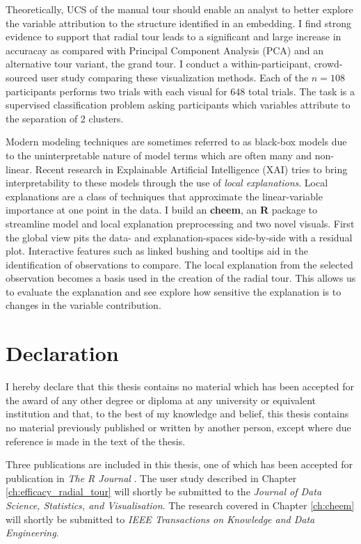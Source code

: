 \documentclass{template/monashthesis}
\begin{document}
Theoretically, UCS of the manual tour should enable an analyst to better explore the variable attribution to the structure identified in an embedding. I find strong evidence to support that radial tour leads to a significant and large increase in accuracay as compared with Principal Component Analysis (PCA) and an alternative tour variant, the grand tour. I conduct a within-participant, crowd-sourced user study comparing these visualization methods. Each of the \(n=108\) participants performs two trials with each visual for 648 total trials. The task is a supervised classification problem asking participants which variables attribute to the separation of 2 clusters.

Modern modeling techniques are sometimes referred to as black-box models due to the uninterpretable nature of model terms which are often many and non-linear. Recent research in Explainable Artificial Intelligence (XAI) tries to bring interpretability to these models through the use of \emph{local explanations}. Local explanations are a class of techniques that approximate the linear-variable importance at one point in the data. I build an \textbf{cheem}, an \textbf{R} package to streamline model and local explanation preprocessing and two novel visuals. First the global view pits the data- and explanation-spaces side-by-side with a residual plot. Interactive features such as linked bushing and tooltips aid in the identification of observations to compare. The local explanation from the selected observation becomes a basis used in the creation of the radial tour. This allows us to evaluate the explanation and see explore how sensitive the explanation is to changes in the variable contribution.

\clearpage{}\setcounter{page}{0}

\hypertarget{declaration}{%
\chapter*{Declaration}\label{declaration}}

I hereby declare that this thesis contains no material which has been accepted for the award of any other degree or diploma at any university or equivalent institution and that, to the best of my knowledge and belief, this thesis contains no material previously published or written by another person, except where due reference is made in the text of the thesis.

Three publications are included in this thesis, one of which has been accepted for publication in \emph{The R Journal} \autocite{spyrison_spinifex_2020}. The user study described in Chapter \ref{ch:efficacy_radial_tour} will shortly be submitted to the \emph{Journal of Data Science, Statistics, and Visualisation}. The research covered in Chapter \ref{ch:cheem} will shortly be submitted to \emph{IEEE Transactions on Knowledge and Data Engineering}.
\end{document}
